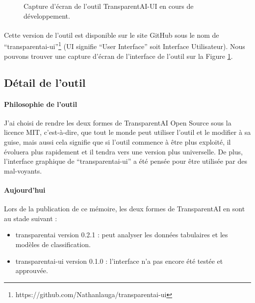 \documentclass[10pt, french, a4paper]{report}
\begin{document}
\begin{center}
  \begin{figure}[hbt!]
    \caption{Capture d'écran de l'outil TransparentAI-UI en cours de développement.}
    \label{fig:capt_ecran_transparentai}
  \end{figure}
\end{center}
  

\paragraph{}
Cette version de l'outil est disponible sur le site GitHub sous le nom de ``transparentai-ui''\footnote{https://github.com/Nathanlauga/transparentai-ui} (UI signifie ``User Interface'' soit Interface Utilisateur). Nous pouvons trouver une capture d'écran de l'interface de l'outil sur la Figure \ref{fig:capt_ecran_transparentai}.

\subsection{Détail de l'outil}

\paragraph{Philosophie de l'outil}
J'ai choisi de rendre les deux formes de TransparentAI Open Source sous la licence MIT, c'est-à-dire, que tout le monde peut utiliser l'outil et le modifier à sa guise, mais aussi cela signifie que si l'outil commence à être plus exploité, il évoluera plus rapidement et il tendra vers une version plus universelle. De plus, l'interface graphique de ``transparentai-ui'' a été pensée pour être utilisée par des mal-voyants.

\paragraph{Aujourd’hui}
Lors de la publication de ce mémoire, les deux formes de TransparentAI en sont au stade suivant :
\begin{itemize}
  \item transparentai version 0.2.1 : peut analyser les données tabulaires et les modèles de classification.
  \item transparentai-ui version 0.1.0 : l'interface n'a pas encore été testée et approuvée.
\end{itemize}  
\end{document}
